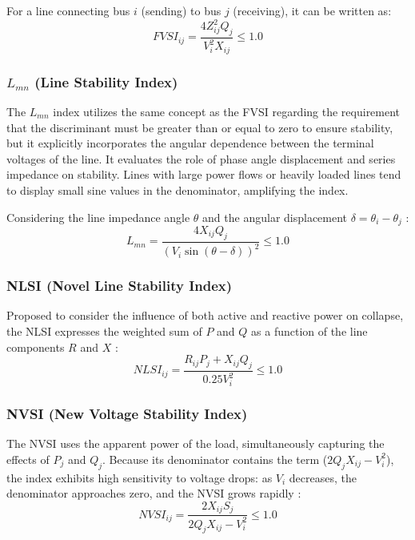 \documentclass{ieeeaccess}
\begin{document}
For a line connecting bus $i$ (sending) to bus $j$ (receiving), it can be written as:
\begin{equation}
FVSI_{ij} = \frac{4 Z_{ij}^2 Q_j}{V_i^2 X_{ij}} \le 1.0
\end{equation}

\subsubsection{$L_{mn}$ (Line Stability Index)}
The $L_{mn}$ index utilizes the same concept as the FVSI regarding the requirement that the discriminant must be greater than or equal to zero to ensure stability, but it explicitly incorporates the angular dependence between the terminal voltages of the line. It evaluates the role of phase angle displacement and series impedance on stability. Lines with large power flows or heavily loaded lines tend to display small sine values in the denominator, amplifying the index.

Considering the line impedance angle $\theta$ and the angular displacement $\delta = \theta_i - \theta_j$ \cite{moghavvemi98}:
\begin{equation}
L_{mn} = \frac{4 X_{ij} Q_j}{(V_i \sin(\theta - \delta))^2} \le 1.0
\end{equation}

\subsubsection{NLSI (Novel Line Stability Index)}
Proposed to consider the influence of both active and reactive power on collapse, the NLSI expresses the weighted sum of $P$ and $Q$ as a function of the line components $R$ and $X$ \cite{YazdanpanahGoharrizi2007}:
\begin{equation}
NLSI_{ij} = \frac{R_{ij} P_j + X_{ij} Q_j}{0.25 V_i^2} \le 1.0
\end{equation}

\subsubsection{NVSI (New Voltage Stability Index)}
The NVSI uses the apparent power of the load, simultaneously capturing the effects of $P_j$ and $Q_j$. Because its denominator contains the term ($2 Q_j X_{ij} - V_i^2$), the index exhibits high sensitivity to voltage drops: as $V_i$ decreases, the denominator approaches zero, and the NVSI grows rapidly \cite{kanimozhi2013novel}:
\begin{equation}
NVSI_{ij} = \frac{2 X_{ij} S_j}{2 Q_j X_{ij} - V_i^2} \le 1.0
\end{equation}
\end{document}
